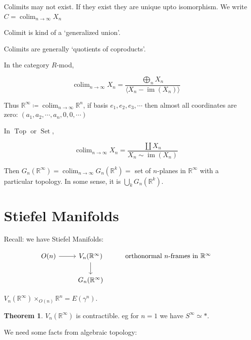\documentclass{article}
\theoremstyle{definition}
\newtheorem{theorem}{Theorem}
\begin{document}
    Colimits may not exist. If they exist they are unique upto isomorphism. We write \(C = \operatorname{colim}_{n\to \infty} X_n\) 

    Colimit is kind of a `generalized union'.

    Colimits are generally `quotients of coproducts'.

    In the category \(R\)-mod, 

    \[
        \operatorname{colim}_{n\to \infty} X_n = \frac{\bigoplus_{n} X_n}{\langle X_n - \operatorname{im} (X_{n}) \rangle }
    \]

    Thus \(\mathbb{R}^{\infty} \coloneqq \operatorname{colim}_{n\to \infty} \mathbb{R}^n\), if basis \(e_1, e_2, e_3, \cdots\) then almost all coordinates are zero: \((a_1, a_2, \cdots , a_n, 0, 0, \cdots)\) 

    In \(\operatorname{Top}\) or \(\operatorname{Set}\),

    \[
        \operatorname{colim}_{n\to \infty} X_n = \frac{\coprod X_n}{X_n \sim \operatorname{im} (X_n)}
    \]

    Then \(G_n(\mathbb{R}^{\infty}) = \operatorname{colim}_{n\to \infty} G_n(\mathbb{R}^k) =\) set of \(n\)-planes in \(\mathbb{R}^{\infty}\) with a particular topology. In some sense, it is \(\bigcup_{k} G_n(\mathbb{R}^k)\).

    \section*{Stiefel Manifolds}

    Recall: we have Stiefel Manifolds:

    \[
        \begin{tikzcd}
            O(n) \ar[r] & V_n(\mathbb{R}^{\infty}) \ar[d] & \text{orthonormal \(n\)-frames in \(\mathbb{R}^{\infty}\)} \\ & G_n(\mathbb{R}^{\infty}) 
        \end{tikzcd}
    \]

    \(V_n(\mathbb{R}^{\infty}) \times_{O(n)} \mathbb{R}^n = E(\gamma^n)\).

    \begin{theorem}
        \(V_n(\mathbb{R}^{\infty})\) is contractible. eg for \(n=1\) we have \(S^{\infty} \simeq \ast\).
    \end{theorem}

    We need some facts from algebraic topology:
\end{document}
